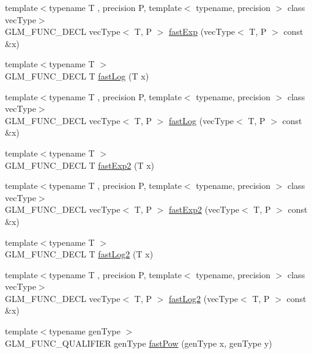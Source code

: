 \begin{DoxyCompactItemize}
{\footnotesize template$<$typename T , precision P, template$<$ typename, precision $>$ class vec\+Type$>$ }\\G\+L\+M\+\_\+\+F\+U\+N\+C\+\_\+\+D\+E\+C\+L vec\+Type$<$ T, P $>$ \hyperlink{group__gtx__fast__exponential_ga4faf0b61115de36efcf47c4ecb55a5fa}{fast\+Exp} (vec\+Type$<$ T, P $>$ const \&x)
\item 
{\footnotesize template$<$typename T $>$ }\\G\+L\+M\+\_\+\+F\+U\+N\+C\+\_\+\+D\+E\+C\+L T \hyperlink{group__gtx__fast__exponential_gae1bdc97b7f96a600e29c753f1cd4388a}{fast\+Log} (T x)
\item 
{\footnotesize template$<$typename T , precision P, template$<$ typename, precision $>$ class vec\+Type$>$ }\\G\+L\+M\+\_\+\+F\+U\+N\+C\+\_\+\+D\+E\+C\+L vec\+Type$<$ T, P $>$ \hyperlink{group__gtx__fast__exponential_ga789abcbc34d08008d2f5a4547dd6e5e3}{fast\+Log} (vec\+Type$<$ T, P $>$ const \&x)
\item 
{\footnotesize template$<$typename T $>$ }\\G\+L\+M\+\_\+\+F\+U\+N\+C\+\_\+\+D\+E\+C\+L T \hyperlink{group__gtx__fast__exponential_ga0af50585955eb14c60bb286297fabab2}{fast\+Exp2} (T x)
\item 
{\footnotesize template$<$typename T , precision P, template$<$ typename, precision $>$ class vec\+Type$>$ }\\G\+L\+M\+\_\+\+F\+U\+N\+C\+\_\+\+D\+E\+C\+L vec\+Type$<$ T, P $>$ \hyperlink{group__gtx__fast__exponential_ga9e6219327b7a33077dbec7620d981fff}{fast\+Exp2} (vec\+Type$<$ T, P $>$ const \&x)
\item 
{\footnotesize template$<$typename T $>$ }\\G\+L\+M\+\_\+\+F\+U\+N\+C\+\_\+\+D\+E\+C\+L T \hyperlink{group__gtx__fast__exponential_ga6e98118685f6dc9e05fbb13dd5e5234e}{fast\+Log2} (T x)
\item 
{\footnotesize template$<$typename T , precision P, template$<$ typename, precision $>$ class vec\+Type$>$ }\\G\+L\+M\+\_\+\+F\+U\+N\+C\+\_\+\+D\+E\+C\+L vec\+Type$<$ T, P $>$ \hyperlink{group__gtx__fast__exponential_gabc46086fe6636b8be87f09e6c5d2bb58}{fast\+Log2} (vec\+Type$<$ T, P $>$ const \&x)
\item 
{\footnotesize template$<$typename gen\+Type $>$ }\\G\+L\+M\+\_\+\+F\+U\+N\+C\+\_\+\+Q\+U\+A\+L\+I\+F\+I\+E\+R gen\+Type \hyperlink{group__gtx__fast__exponential_ga5340e98a11fcbbd936ba6e983a154d50}{fast\+Pow} (gen\+Type x, gen\+Type y)

\end{DoxyCompactItemize}
